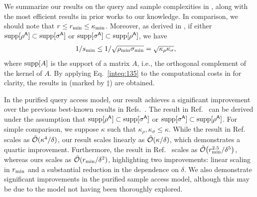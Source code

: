 We summarize our results on the query and sample complexities in , along with the most efficient results in prior works to our knowledge.
In comparison, we should note that $r \leq r_{\rm min} \leq \kappa_{\rm min}$. Moreover, as derived in , if either $\mathrm{supp}[\rho^{\mathsf{A}}] \subset \mathrm{supp}[\sigma^{\mathsf{A}}]$ or $\mathrm{supp}[\sigma^{\mathsf{A}}] \subset \mathrm{supp}[\rho^{\mathsf{A}}]$, we have
\begin{align}
\label{inteq:135}
    1/s_{\rm min} 
    &\leq 1/\sqrt{\rho_{\rm min}\sigma_{\rm min}} = \sqrt{\kappa_\rho\kappa_\sigma}, 
\end{align}
where $\mathrm{supp}[A]$ is the support of a matrix $A$, i.e., the orthogonal complement of the kernel of $A$.
By applying Eq.~\eqref{inteq:135} to the computational costs in  for clarity, the results in  (marked by $\ddag$) are obtained.


In the purified query access model, our result achieves a significant improvement over the previous best-known results in Refs.~\cite{gilyen2022improvedfidelity, Liu2024geometricmean}.
The result in Ref.~\cite{Liu2024geometricmean} can be derived under the assumption that $\mathrm{supp}[\rho^{\mathsf{A}}] \subset \mathrm{supp}[\sigma^{\mathsf{A}}]$ or $\mathrm{supp}[\sigma^{\mathsf{A}}] \subset \mathrm{supp}[\rho^{\mathsf{A}}]$.
For simple comparison, we suppose $\kappa$ such that $\kappa_\rho, \kappa_\sigma \leq \kappa$.
While the result in Ref.~\cite{Liu2024geometricmean} scales as $\tilde{{\mathcal{O}}}(\kappa^4/\delta)$, our result scales linearly as $\tilde{{\mathcal{O}}}(\kappa/\delta)$, which demonstrates a quartic improvement.
Furthermore, the result in Ref.~\cite{gilyen2022improvedfidelity} scales as $\tilde{{\mathcal{O}}}\big(r_{\rm min}^{2.5}/\delta^5\big)$, whereas ours scales as $\tilde{{\mathcal{O}}}(r_{\rm min}/\delta^2)$, highlighting two improvements: linear scaling in $r_{\rm min}$ and a substantial reduction in the dependence on $\delta$.
We also demonstrate significant improvements in the purified sample access model, although this may be due to the model not having been thoroughly explored.





